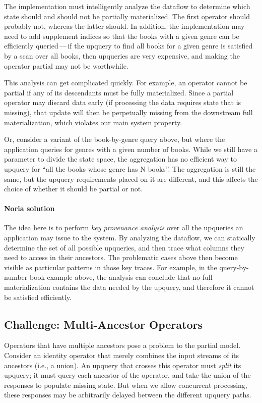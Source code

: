 The implementation must intelligently analyze the dataflow to determine
which state should and should not be partially materialized. The first
operator should probably not, whereas the latter should. In addition,
the implementation may need to add supplement indices so that the books
with a given genre can be efficiently queried\,---\,if the upquery to find
all books for a given genre is satisfied by a scan over all books, then
upqueries are very expensive, and making the operator partial may not be
worthwhile.

This analysis can get complicated quickly. For example, an operator
cannot be partial if any of its descendants must be fully materialized.
Since a partial operator may discard data early (if processing the data
requires state that is missing), that update will then be perpetually
missing from the downstream full materialization, which violates our
main system property.

Or, consider a variant of the book-by-genre query above, but where the
application queries for genres with a given number of books. While we
still have a parameter to divide the state space, the aggregation has no
efficient way to upquery for ``all the books whose genre has N books''.
The aggregation is still the same, but the upquery requirements placed
on it are different, and this affects the choice of whether it should be
partial or not.

\paragraph{Noria solution}
The idea here is to perform \emph{key provenance analysis} over all the
upqueries an application may issue to the system. By analyzing the dataflow, we
can statically determine the set of all possible upqueries, and then trace what
columns they need to access in their ancestors. The problematic cases above then
become visible as particular patterns in those key traces. For example, in the
query-by-number book example above, the analysis can conclude that no full
materialization contains the data needed by the upquery, and therefore it cannot
be satisfied efficiently.

\subsection{Challenge: Multi-Ancestor Operators}

Operators that have multiple ancestors pose a problem to the partial
model. Consider an identity operator that merely combines the input
streams of its ancestors (i.e., a union). An upquery that crosses this
operator must \emph{split} its upquery; it must query each ancestor of the
operator, and take the union of the responses to populate missing state.
But when we allow concurrent processing, these responses may be
arbitrarily delayed between the different upquery paths.

